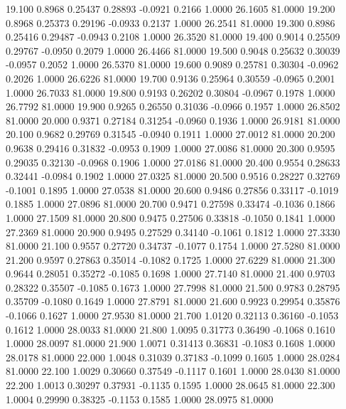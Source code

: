   19.100   0.8968   0.25437   0.28893  -0.0921   0.2166   1.0000  26.1605  81.0000
  19.200   0.8968   0.25373   0.29196  -0.0933   0.2137   1.0000  26.2541  81.0000
  19.300   0.8986   0.25416   0.29487  -0.0943   0.2108   1.0000  26.3520  81.0000
  19.400   0.9014   0.25509   0.29767  -0.0950   0.2079   1.0000  26.4466  81.0000
  19.500   0.9048   0.25632   0.30039  -0.0957   0.2052   1.0000  26.5370  81.0000
  19.600   0.9089   0.25781   0.30304  -0.0962   0.2026   1.0000  26.6226  81.0000
  19.700   0.9136   0.25964   0.30559  -0.0965   0.2001   1.0000  26.7033  81.0000
  19.800   0.9193   0.26202   0.30804  -0.0967   0.1978   1.0000  26.7792  81.0000
  19.900   0.9265   0.26550   0.31036  -0.0966   0.1957   1.0000  26.8502  81.0000
  20.000   0.9371   0.27184   0.31254  -0.0960   0.1936   1.0000  26.9181  81.0000
  20.100   0.9682   0.29769   0.31545  -0.0940   0.1911   1.0000  27.0012  81.0000
  20.200   0.9638   0.29416   0.31832  -0.0953   0.1909   1.0000  27.0086  81.0000
  20.300   0.9595   0.29035   0.32130  -0.0968   0.1906   1.0000  27.0186  81.0000
  20.400   0.9554   0.28633   0.32441  -0.0984   0.1902   1.0000  27.0325  81.0000
  20.500   0.9516   0.28227   0.32769  -0.1001   0.1895   1.0000  27.0538  81.0000
  20.600   0.9486   0.27856   0.33117  -0.1019   0.1885   1.0000  27.0896  81.0000
  20.700   0.9471   0.27598   0.33474  -0.1036   0.1866   1.0000  27.1509  81.0000
  20.800   0.9475   0.27506   0.33818  -0.1050   0.1841   1.0000  27.2369  81.0000
  20.900   0.9495   0.27529   0.34140  -0.1061   0.1812   1.0000  27.3330  81.0000
  21.100   0.9557   0.27720   0.34737  -0.1077   0.1754   1.0000  27.5280  81.0000
  21.200   0.9597   0.27863   0.35014  -0.1082   0.1725   1.0000  27.6229  81.0000
  21.300   0.9644   0.28051   0.35272  -0.1085   0.1698   1.0000  27.7140  81.0000
  21.400   0.9703   0.28322   0.35507  -0.1085   0.1673   1.0000  27.7998  81.0000
  21.500   0.9783   0.28795   0.35709  -0.1080   0.1649   1.0000  27.8791  81.0000
  21.600   0.9923   0.29954   0.35876  -0.1066   0.1627   1.0000  27.9530  81.0000
  21.700   1.0120   0.32113   0.36160  -0.1053   0.1612   1.0000  28.0033  81.0000
  21.800   1.0095   0.31773   0.36490  -0.1068   0.1610   1.0000  28.0097  81.0000
  21.900   1.0071   0.31413   0.36831  -0.1083   0.1608   1.0000  28.0178  81.0000
  22.000   1.0048   0.31039   0.37183  -0.1099   0.1605   1.0000  28.0284  81.0000
  22.100   1.0029   0.30660   0.37549  -0.1117   0.1601   1.0000  28.0430  81.0000
  22.200   1.0013   0.30297   0.37931  -0.1135   0.1595   1.0000  28.0645  81.0000
  22.300   1.0004   0.29990   0.38325  -0.1153   0.1585   1.0000  28.0975  81.0000
